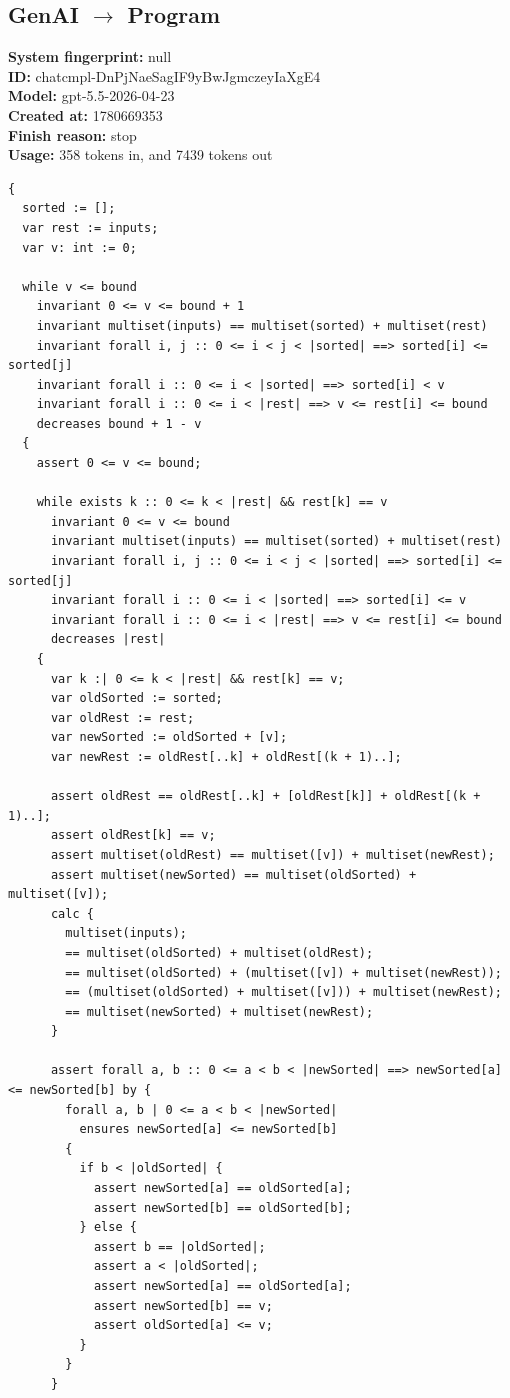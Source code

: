 \documentclass{article}
\begin{document}
\subsection*{GenAI $\rightarrow$ Program}
\textbf{System fingerprint: }null
\\\textbf{ID: }chatcmpl-DnPjNaeSagIF9yBwJgmczeyIaXgE4
\\\textbf{Model: }gpt-5.5-2026-04-23
\\\textbf{Created at: }1780669353
\\\textbf{Finish reason: }stop
\\\textbf{Usage: }358 tokens in, and 7439 tokens out
\begin{lstlisting}
{
  sorted := [];
  var rest := inputs;
  var v: int := 0;

  while v <= bound
    invariant 0 <= v <= bound + 1
    invariant multiset(inputs) == multiset(sorted) + multiset(rest)
    invariant forall i, j :: 0 <= i < j < |sorted| ==> sorted[i] <= sorted[j]
    invariant forall i :: 0 <= i < |sorted| ==> sorted[i] < v
    invariant forall i :: 0 <= i < |rest| ==> v <= rest[i] <= bound
    decreases bound + 1 - v
  {
    assert 0 <= v <= bound;

    while exists k :: 0 <= k < |rest| && rest[k] == v
      invariant 0 <= v <= bound
      invariant multiset(inputs) == multiset(sorted) + multiset(rest)
      invariant forall i, j :: 0 <= i < j < |sorted| ==> sorted[i] <= sorted[j]
      invariant forall i :: 0 <= i < |sorted| ==> sorted[i] <= v
      invariant forall i :: 0 <= i < |rest| ==> v <= rest[i] <= bound
      decreases |rest|
    {
      var k :| 0 <= k < |rest| && rest[k] == v;
      var oldSorted := sorted;
      var oldRest := rest;
      var newSorted := oldSorted + [v];
      var newRest := oldRest[..k] + oldRest[(k + 1)..];

      assert oldRest == oldRest[..k] + [oldRest[k]] + oldRest[(k + 1)..];
      assert oldRest[k] == v;
      assert multiset(oldRest) == multiset([v]) + multiset(newRest);
      assert multiset(newSorted) == multiset(oldSorted) + multiset([v]);
      calc {
        multiset(inputs);
        == multiset(oldSorted) + multiset(oldRest);
        == multiset(oldSorted) + (multiset([v]) + multiset(newRest));
        == (multiset(oldSorted) + multiset([v])) + multiset(newRest);
        == multiset(newSorted) + multiset(newRest);
      }

      assert forall a, b :: 0 <= a < b < |newSorted| ==> newSorted[a] <= newSorted[b] by {
        forall a, b | 0 <= a < b < |newSorted|
          ensures newSorted[a] <= newSorted[b]
        {
          if b < |oldSorted| {
            assert newSorted[a] == oldSorted[a];
            assert newSorted[b] == oldSorted[b];
          } else {
            assert b == |oldSorted|;
            assert a < |oldSorted|;
            assert newSorted[a] == oldSorted[a];
            assert newSorted[b] == v;
            assert oldSorted[a] <= v;
          }
        }
      }


\end{lstlisting}
\end{document}
